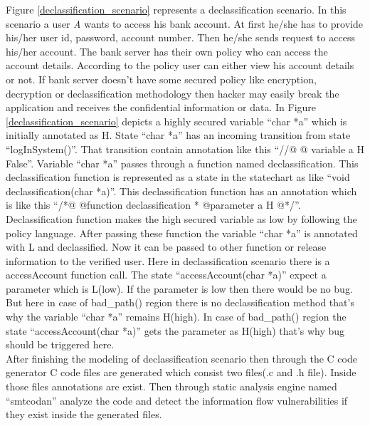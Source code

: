  Figure \ref{declassification_scenario}  represents a declassification scenario. In this scenario a user \emph{A} wants to access his bank account. At first he/she has to provide his/her user id, password, account number. Then he/she sends request to access his/her account. The bank server has their own policy who can access the account details. According to the policy user can either view his account details or not. If bank server doesn't have some secured policy like encryption, decryption or declassification methodology then hacker may easily break the application and receives the confidential information or data. In Figure \ref{declassification_scenario} depicts a highly secured variable \enquote{char *a} which is initially annotated as H. State \enquote{char *a} has an incoming transition from state \enquote{logInSystem()}. That transition contain annotation like this \enquote{//@ @ variable a H False}. Variable \enquote{char *a} passes through a function named declassification. This declassification function is represented as a state in the statechart as like \enquote{void declassification(char *a)}. This declassification function has an annotation which is like this \enquote{/*@ @function declassification * @parameter a H @*/}. Declassification function makes the high secured variable as low by following the policy language. After passing these function the variable \enquote{char *a} is annotated with L and declassified. Now it can be passed to other function or release information to the verified user. Here in declassification scenario there is a accessAccount function call. The state \enquote{accessAccount(char *a)} expect a parameter which is L(low). If the parameter is low then there would be no bug. But here in case of bad\_path() region there is no declassification method that's why the variable \enquote{char *a} remains H(high). In case of bad\_path() region the state \enquote{accessAccount(char *a)} gets the parameter as H(high) that's why bug should be triggered here. \\
 
 After finishing the modeling of declassification scenario then through the C code generator C code files are generated which consist two files(.c and .h file). Inside those files annotations are exist. Then through static analysis engine named \enquote{smtcodan} analyze the code and detect the information flow vulnerabilities if they exist inside the generated files.
 
